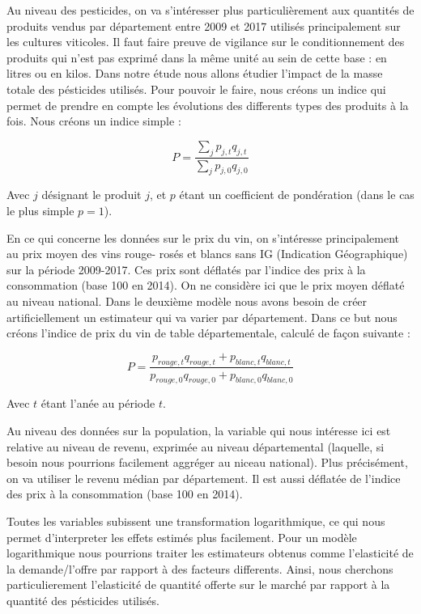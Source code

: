 \documentclass[11pt,]{article}
\begin{document}
Au niveau des pesticides, on va s'intéresser plus particulièrement aux
quantités de produits vendus par département entre 2009 et 2017 utilisés
principalement sur les cultures viticoles. Il faut faire preuve de
vigilance sur le conditionnement des produits qui n'est pas exprimé dans
la même unité au sein de cette base : en litres ou en kilos. Dans notre
étude nous allons étudier l'impact de la masse totale des pésticides
utilisés. Pour pouvoir le faire, nous créons un indice qui permet de
prendre en compte les évolutions des differents types des produits à la
fois. Nous créons un indice simple :

\begin{equation*}
  P = \frac{\sum_j p_{j, t} q_{j, t}}{\sum_j p_{j, 0} q_{j, 0}}
\end{equation*}

Avec \(j\) désignant le produit \(j\), et \(p\) étant un coefficient de
pondération (dans le cas le plus simple \(p = 1\)).

En ce qui concerne les données sur le prix du vin, on s'intéresse
principalement au prix moyen des vins rouge- rosés et blancs sans IG
(Indication Géographique) sur la période 2009-2017. Ces prix sont
déflatés par l'indice des prix à la consommation (base 100 en 2014). On
ne considère ici que le prix moyen déflaté au niveau national. Dans le
deuxième modèle nous avons besoin de créer artificiellement un
estimateur qui va varier par département. Dans ce but nous créons
l'indice de prix du vin de table départementale, calculé de façon
suivante :

\begin{equation*}
  P = \frac{p_{rouge, t} q_{rouge, t} + p_{blanc, t} q_{blanc, t}}{p_{rouge, 0} q_{rouge, 0} + p_{blanc, 0} q_{blanc, 0}}
\end{equation*}

Avec \(t\) étant l'anée au période \(t\).

Au niveau des données sur la population, la variable qui nous intéresse
ici est relative au niveau de revenu, exprimée au niveau départemental
(laquelle, si besoin nous pourrions facilement aggréger au niceau
national). Plus précisément, on va utiliser le revenu médian par
département. Il est aussi déflatée de l'indice des prix à la
consommation (base 100 en 2014).

Toutes les variables subissent une transformation logarithmique, ce qui
nous permet d'interpreter les effets estimés plus facilement. Pour un
modèle logarithmique nous pourrions traiter les estimateurs obtenus
comme l'elasticité de la demande/l'offre par rapport à des facteurs
differents. Ainsi, nous cherchons particulierement l'elasticité de
quantité offerte sur le marché par rapport à la quantité des pésticides
utilisés.
\end{document}
